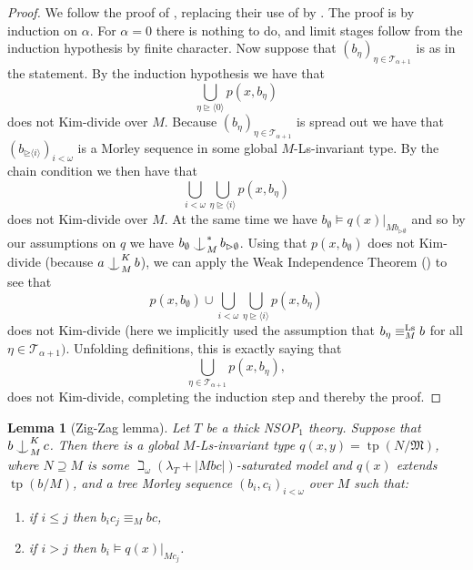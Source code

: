 \documentclass[a4paper, reqno]{amsart}
\newtheorem{lemma}[theorem]{Lemma}
\theoremstyle{definition}
\theoremstyle{repeat}
\newcommand{\MM}{\mathfrak{M}}
\newcommand{\T}{\mathcal{T}}
\DeclareMathOperator{\tp}{tp}
\newcommand{\equivls}{\equiv^\textup{Ls}}
\def\Ind#1#2{#1\setbox0=\hbox{$#1x$}\kern\wd0\hbox to 0pt{\hss$#1\mid$\hss}
\lower.9\ht0\hbox to 0pt{\hss$#1\smile$\hss}\kern\wd0}
\def\ind{\mathop{\mathpalette\Ind{}}}
\begin{document}
\begin{proof}
We follow the proof of \cite[Lemma 6.2]{kaplan_kim-independence_2020}, replacing their use of \cite[Proposition 6.1]{kaplan_kim-independence_2020} by . The proof is by induction on $\alpha$. For $\alpha = 0$ there is nothing to do, and limit stages follow from the induction hypothesis by finite character. Now suppose that $(b_\eta)_{\eta \in \T_{\alpha + 1}}$ is as in the statement. By the induction hypothesis we have that
\[
\bigcup_{\eta \unrhd \langle 0 \rangle} p(x, b_\eta)
\]
does not Kim-divide over $M$. Because $(b_\eta)_{\eta \in \T_{\alpha + 1}}$ is spread out we have that $(b_{\unrhd \langle i \rangle})_{i < \omega}$ is a Morley sequence in some global $M$-Ls-invariant type. By the chain condition  we then have that
\[
\bigcup_{i < \omega} \bigcup_{\eta \unrhd \langle i \rangle} p(x, b_\eta)
\]
does not Kim-divide over $M$. At the same time we have $b_\emptyset \models q(x)|_{M b_{\rhd \emptyset}}$ and so by our assumptions on $q$ we have $b_\emptyset \ind^*_M  b_{\rhd \emptyset}$. Using that $p(x, b_\emptyset)$ does not Kim-divide (because $a \ind^K_M b$), we can apply the Weak Independence Theorem () to see that
\[
p(x, b_\emptyset) \cup \bigcup_{i < \omega} \bigcup_{\eta \unrhd \langle i \rangle} p(x, b_\eta)
\]
does not Kim-divide (here we implicitly used the assumption that $b_\eta \equivls_M b$ for all $\eta \in \T_{\alpha+1})$. Unfolding definitions, this is exactly saying that
\[
\bigcup_{\eta \in \T_{\alpha + 1}} p(x, b_\eta),
\]
does not Kim-divide, completing the induction step and thereby the proof.
\end{proof}
\begin{lemma}[Zig-Zag lemma]
Let $T$ be a thick NSOP$_1$ theory. Suppose that $b \ind^K_M c$. Then there is a global $M$-Ls-invariant type $q(x,y) = \tp(N/\MM)$, where $N \supseteq M$ is some $\beth_\omega(\lambda_T + |Mbc|)$-saturated model and $q(x)$ extends $\tp(b/M)$, and a tree Morley sequence $(b_i, c_i)_{i < \omega}$ over $M$ such that:
\begin{enumerate}[label=(\roman*)]
\item if $i \leq j$ then $b_i c_j \equiv_M bc$,
\item if $i > j$ then $b_i \models q(x)|_{M c_j}$.
\end{enumerate}
\end{lemma}
\end{document}

